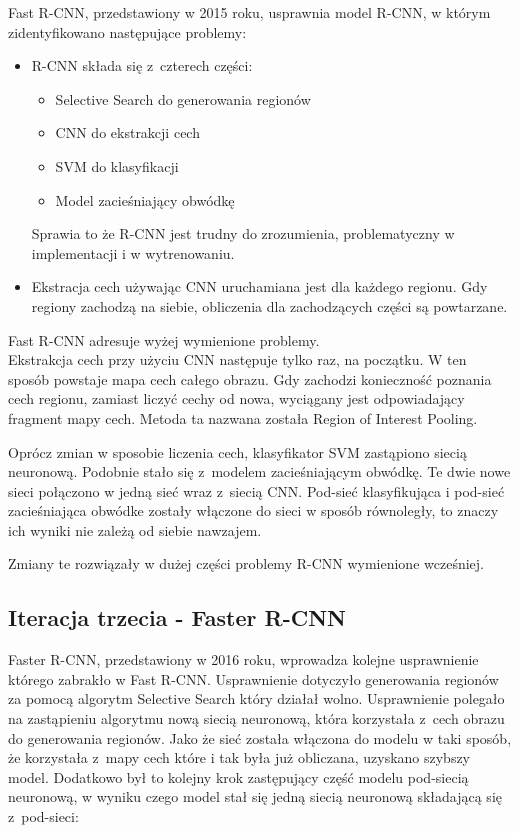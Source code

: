 Fast R-CNN, przedstawiony w 2015 roku, usprawnia model R-CNN, w którym zidentyfikowano następujące problemy:

\begin{itemize}
	\item R-CNN składa się z~czterech części:
		\begin{itemize}
			\item Selective Search do generowania regionów
			\item CNN do ekstrakcji cech
			\item SVM do klasyfikacji
			\item Model zacieśniający obwódkę
		\end{itemize}
		Sprawia to że R-CNN jest trudny do zrozumienia, problematyczny w implementacji i w wytrenowaniu.
  \item Ekstracja cech używając CNN uruchamiana jest dla każdego regionu.
        Gdy regiony zachodzą na siebie, obliczenia dla zachodzących części są powtarzane.
\end{itemize}

Fast R-CNN adresuje wyżej wymienione problemy. \\

Ekstrakcja cech przy użyciu CNN następuje tylko raz, na początku.
W ten sposób powstaje mapa cech całego obrazu.
Gdy zachodzi konieczność poznania cech regionu, zamiast liczyć cechy od nowa, wyciągany jest odpowiadający fragment mapy cech.
Metoda ta nazwana została Region of Interest Pooling.

Oprócz zmian w sposobie liczenia cech, klasyfikator SVM zastąpiono siecią neuronową.
Podobnie stało się z~modelem zacieśniającym obwódkę.
Te dwie nowe sieci połączono w jedną sieć wraz z~siecią CNN.
Pod-sieć klasyfikująca i pod-sieć zacieśniająca obwódke zostały włączone do sieci w sposób równoległy, to znaczy ich wyniki nie zależą od siebie nawzajem.

Zmiany te rozwiązały w dużej części problemy R-CNN wymienione wcześniej.

\subsection{Iteracja trzecia - Faster R-CNN}


Faster R-CNN, przedstawiony w 2016 roku, wprowadza kolejne usprawnienie którego zabrakło w Fast R-CNN.
Usprawnienie dotyczyło generowania regionów za pomocą algorytm Selective Search który działał wolno.
Usprawnienie polegało na zastąpieniu algorytmu nową siecią neuronową, która korzystała z~cech obrazu do generowania regionów.
Jako że sieć została włączona do modelu w taki sposób, że korzystała z~mapy cech które i tak była już obliczana, uzyskano szybszy model.
Dodatkowo był to kolejny krok zastępujący część modelu pod-siecią neuronową, w wyniku czego model stał się jedną siecią neuronową składającą się z~pod-sieci:

